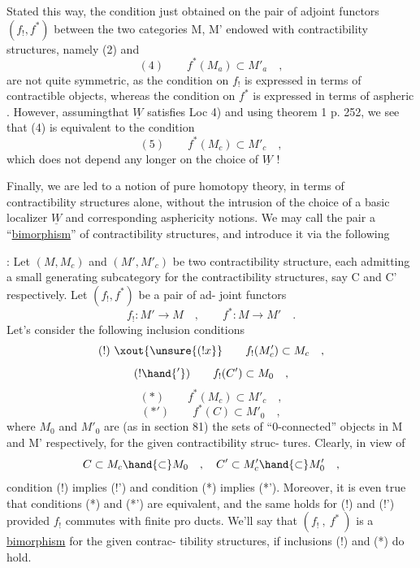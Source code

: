 
Stated this way, the condition just obtained on the pair of adjoint
functors $(f_!,f^*)$\hand{,} between the two  categories
M, M' endowed with contractibility structures, namely (2) and
\[ (4) \qquad f^*(M_a) \subset M'_a \quad , \]
are not quite symmetric, as the condition on $f_!$ is expressed in terms
of contractible objects, whereas the condition on $f^*$ is expressed in
terms of aspheric . However, assuming\hand{/}that $\underline{W}$ satisfies Loc 4)
and using theorem 1 p. 252, we see that (4)\hand{/} is equivalent to the
condition
\[ (5) \qquad f^*(M_c) \subset M'_c \quad , \]
which does not depend any longer on the choice of $\underline{W}$ !

Finally, we are led to a notion of pure homotopy theory, in
terms of contractibility structures alone, without the intrusion of
the choice of a basic localizer $\underline{W}$ and corresponding asphericity notions.
We may call  the pair a ``\uline{bimorphism}'' of contractibility structures,
and introduce it via the following 

 : Let $(M,M_c)$ and $(M',M'_c)$ be two contractibility structure,
each admitting a small generating subcategory for the contractibility
structures, say C and C' respectively. Let $(f_!,f^*)$ be a pair of ad-%
joint functors
\[ f_! : M' \longrightarrow M \quad , \qquad f^* : M \longrightarrow M' \quad . \]
Let's consider the following inclusion conditions
\[ (!) \ \xout{\unsure{(!x}} \qquad f_!(M'_c) \subset M_c \quad , \]
\[ (!\hand{'}) \qquad f_!(C') \subset M_0 \quad , \]
\[ (*) \qquad f^*(M_c) \subset M'_c \quad , \]
\[ (*') \qquad f^*(C) \subset M'_0 \quad , \]
where $M_0$ and $M'_0$ are (as in section 81) the sets of ``0-connected''
objects in M and M' respectively, for the given contractibility struc-%
tures. \deleted{(}Clearly, in view of
\[ C \subset M_c \hand{\subset} M_0 \quad , \quad C' \subset M'_c \hand{\subset} M'_0 \quad , \]
condition (!) implies (!') and condition (*) implies (*')\deleted{)}. Moreover,
it is even true that conditions (*) and (*') are equivalent, and the
same holds for (!) and (!') provided $f_!$ commutes with finite pro\hand{-}%
ducts. We'll say that $(f_!\ ,\ f^*\ )$ is a \uline{bimorphism} for the given contrac-%
tibility structures, if  inclusions (!) and (*) do hold.

